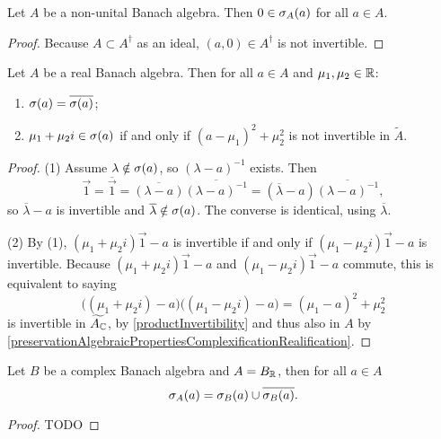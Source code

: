 \begin{lemma}
Let $A$ be a non-unital Banach algebra. Then $0\in\sigma_A(a)$ for all $a\in A$.
\end{lemma}
\begin{proof}
Because $A\subset A^\dagger$ as an ideal, $(a,0)\in A^\dagger$ is not invertible.
\end{proof}

\begin{lemma}
Let $A$ be a real Banach algebra. Then for all $a\in A$ and $\mu_1,\mu_2\in \mathbb{R}$:
\begin{enumerate}
\item $\sigma(a) = \overline{\sigma(a)}$;
\item $\mu_1 + \mu_2 i \in \sigma(a)$ \textup{if and only if} $(a-\mu_1)^2+\mu_2^2$ is not invertible in $\tilde{A}$.
\end{enumerate}
\end{lemma}
\begin{proof}
(1) Assume $\lambda \notin \sigma(a)$, so $(\lambda-a)^{-1}$ exists. Then
\[ \vec{1} = \overline{\vec{1}} = \overline{(\lambda-a)}\overline{(\lambda-a)^{-1}} = (\overline{\lambda}-a)\overline{(\lambda-a)^{-1}}, \]
so $\overline{\lambda}-a$ is invertible and $\overline{\lambda}\notin \sigma(a)$. The converse is identical, using $\overline{\lambda}$.

(2) By (1), $(\mu_1 + \mu_2 i)\vec{1}- a$ is invertible if and only if $(\mu_1 - \mu_2 i)\vec{1}-a$ is invertible. Because $(\mu_1 + \mu_2 i)\vec{1}-a$ and $(\mu_1 - \mu_2 i)\vec{1}-a$ commute, this is equivalent to saying
\[ \big((\mu_1 + \mu_2 i)-a\big)\big((\mu_1 - \mu_2 i)-a\big) = (\mu_1-a)^2 + \mu_2^2 \]
is invertible in $\widetilde{A_{\mathbb{C}}}$, by \ref{productInvertibility} and thus also in $A$ by \ref{preservationAlgebraicPropertiesComplexificationRealification}.
\end{proof}

\begin{proposition}
Let $B$ be a complex Banach algebra and $A = B_{\mathbb{R}}$, then for all $a\in A$
\[ \sigma_A(a) = \sigma_B(a) \cup \overline{\sigma_B(a)}. \]
\end{proposition}
\begin{proof}
TODO
\end{proof}

